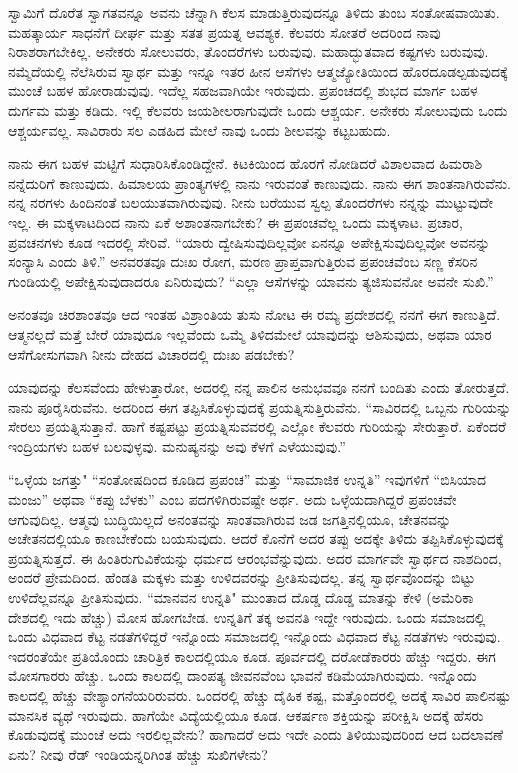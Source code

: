 ಸ್ವಾಮಿಗೆ ದೊರೆತ ಸ್ವಾಗತವನ್ನೂ ಅವನು ಚೆನ್ನಾಗಿ ಕೆಲಸ ಮಾಡುತ್ತಿರುವುದನ್ನೂ ತಿಳಿದು ತುಂಬ ಸಂತೋಷವಾಯಿತು. ಮಹತ್ಕಾರ್ಯ ಸಾಧನೆಗೆ ದೀರ್ಘ ಮತ್ತು ಸತತ ಪ್ರಯತ್ನ ಆವಶ್ಯಕ. ಕೆಲವರು ಸೋತರೆ ಅದರಿಂದ ನಾವು ನಿರಾಶರಾಗಬೇಕಿಲ್ಲ. ಅನೇಕರು ಸೋಲುವರು, ತೊಂದರೆಗಳು ಬರುವುವು. ಮಹಾದ್ಭುತವಾದ ಕಷ್ಟಗಳು ಬರುವುವು. ನಮ್ಮೆದೆಯಲ್ಲಿ ನೆಲೆಸಿರುವ ಸ್ವಾರ್ಥ ಮತ್ತು ಇನ್ನೂ ಇತರ ಹೀನ ಆಸೆಗಳು ಆತ್ಮಜ್ಯೋತಿಯಿಂದ ಹೊರದೂಡಲ್ಪಡುವುದಕ್ಕೆ ಮುಂಚೆ ಬಹಳ ಹೋರಾಡುವುವು. ಇದೆಲ್ಲ ಸಹಜವಾಗಿಯೇ ಇರುವುದು. ಪ್ರಪಂಚದಲ್ಲಿ ಶುಭದ ಮಾರ್ಗ ಬಹಳ ದುರ್ಗಮ ಮತ್ತು ಕಡಿದು. ಇಲ್ಲಿ ಕೆಲವರು ಜಯಶೀಲರಾಗುವುದೇ ಒಂದು ಆಶ್ಚರ್ಯ. ಅನೇಕರು ಸೋಲುವುದು ಒಂದು ಆಶ್ಚರ್ಯವಲ್ಲ. ಸಾವಿರಾರು ಸಲ ಎಡಹಿದ ಮೇಲೆ ನಾವು ಒಂದು ಶೀಲವನ್ನು ಕಟ್ಟಬಹುದು.

ನಾನು ಈಗ ಬಹಳ ಮಟ್ಟಿಗೆ ಸುಧಾರಿಸಿಕೊಂಡಿದ್ದೇನೆ. ಕಿಟಕಿಯಿಂದ ಹೊರಗೆ ನೋಡಿದರೆ ವಿಶಾಲವಾದ ಹಿಮರಾಶಿ ನನ್ನೆದುರಿಗೆ ಕಾಣುವುದು. ಹಿಮಾಲಯ ಪ್ರಾಂತ್ಯಗಳಲ್ಲಿ ನಾನು ಇರುವಂತೆ ಕಾಣುವುದು. ನಾನು ಈಗ ಶಾಂತನಾಗಿರುವೆನು. ನನ್ನ ನರಗಳು ಹಿಂದಿನಂತೆ ಬಲಯುತವಾಗಿರುವುವು. ನೀನು ಬರೆಯುವ ಸ್ವಲ್ಪ ತೊಂದರೆಗಳು ನನ್ನನ್ನು ಮುಟ್ಟುವುದೇ ಇಲ್ಲ. ಈ ಮಕ್ಕಳಾಟದಿಂದ ನಾನು ಏಕೆ ಅಶಾಂತನಾಗಬೇಕು? ಈ ಪ್ರಪಂಚವೆಲ್ಲ ಒಂದು ಮಕ್ಕಳಾಟ. ಪ್ರಚಾರ, ಪ್ರವಚನಗಳು ಕೂಡ ಇದರಲ್ಲಿ ಸೇರಿವೆ. “ಯಾರು ದ್ವೇಷಿಸುವುದಿಲ್ಲವೋ ಏನನ್ನೂ ಅಪೇಕ್ಷಿಸುವುದಿಲ್ಲವೋ ಅವನನ್ನು ಸಂನ್ಯಾಸಿ ಎಂದು ತಿಳಿ.'' ಅನವರತವೂ ದುಃಖ ರೋಗ, ಮರಣ ಪ್ರಾಪ್ತವಾಗುತ್ತಿರುವ ಪ್ರಪಂಚವೆಂಬ ಸಣ್ಣ ಕೆಸರಿನ ಗುಂಡಿಯಲ್ಲಿ ಅಪೇಕ್ಷಿಸುವುದಾದರೂ ಏನಿರುವುದು? “ಎಲ್ಲಾ ಆಸೆಗಳನ್ನು ಯಾವನು ತ್ಯಜಿಸುವನೋ ಅವನೇ ಸುಖಿ.''

ಅನಂತವೂ ಚಿರಶಾಂತವೂ ಆದ ಇಂತಹ ವಿಶ್ರಾಂತಿಯ ತುಸು ನೋಟ ಈ ರಮ್ಯ ಪ್ರದೇಶದಲ್ಲಿ ನನಗೆ ಈಗ ಕಾಣುತ್ತಿದೆ. ಆತ್ಮನಲ್ಲದೆ ಮತ್ತೆ ಬೇರೆ ಯಾವುದೂ ಇಲ್ಲವೆಂದು ಒಮ್ಮೆ ತಿಳಿದಮೇಲೆ ಯಾವುದನ್ನು ಆಶಿಸುವುದು, ಅಥವಾ ಯಾರ ಆಸೆಗೋಸುಗವಾಗಿ ನೀನು ದೇಹದ ವಿಚಾರದಲ್ಲಿ ದುಃಖ ಪಡಬೇಕು?

\vspace{0.1cm}

ಯಾವುದನ್ನು ಕೆಲಸವೆಂದು ಹೇಳುತ್ತಾರೋ, ಅದರಲ್ಲಿ ನನ್ನ ಪಾಲಿನ ಅನುಭವವೂ ನನಗೆ ಬಂದಿತು ಎಂದು ತೋರುತ್ತದೆ. ನಾನು ಪೂರೈಸಿರುವೆನು. ಅದರಿಂದ ಈಗ ತಪ್ಪಿಸಿಕೊಳ್ಳುವುದಕ್ಕೆ ಪ್ರಯತ್ನಿಸುತ್ತಿರುವೆನು. ``ಸಾವಿರದಲ್ಲಿ ಒಬ್ಬನು ಗುರಿಯನ್ನು ಸೇರಲು ಪ್ರಯತ್ನಿ\break ಸುತ್ತಾನೆ. ಹಾಗೆ ಕಷ್ಟಪಟ್ಟು ಪ್ರಯತ್ನಿಸುವವರಲ್ಲಿ ಎಲ್ಲೋ ಕೆಲವರು ಗುರಿಯನ್ನು ಸೇರುತ್ತಾರೆ. ಏಕೆಂದರೆ ಇಂದ್ರಿಯಗಳು ಬಹಳ ಬಲವುಳ್ಳವು. ಮನುಷ್ಯನನ್ನು ಅವು ಕೆಳಗೆ ಎಳೆಯುವುವು.”

\vspace{0.1cm}

``ಒಳ್ಳೆಯ ಜಗತ್ತು" ``ಸಂತೋಷದಿಂದ ಕೂಡಿದ ಪ್ರಪಂಚ'' ಮತ್ತು ``ಸಾಮಾಜಿಕ ಉನ್ನತಿ'' ಇವುಗಳಿಗೆ ``ಬಿಸಿಯಾದ ಮಂಜು'' ಅಥವಾ  ``ಕಪ್ಪು ಬೆಳಕು'' ಎಂಬ ಪದಗಳಿಗಿರುವಷ್ಟೇ ಅರ್ಥ. ಅದು ಒಳ್ಳೆಯದಾಗಿದ್ದರೆ ಪ್ರಪಂಚವೇ ಆಗುವುದಿಲ್ಲ. ಆತ್ಮವು ಬುದ್ಧಿಯಿಲ್ಲದೆ ಅನಂತವನ್ನು ಸಾಂತವಾಗಿರುವ ಜಡ ಜಗತ್ತಿನಲ್ಲಿಯೂ, ಚೇತನವನ್ನು ಅಚೇತನದಲ್ಲಿಯೂ ಕಾಣಬೇಕೆಂದು ಬಯಸುವುದು. ಆದರೆ ಕೊನೆಗೆ ಅದರ ತಪ್ಪು ಅದಕ್ಕೇ ತಿಳಿದು ತಪ್ಪಿಸಿಕೊಳ್ಳುವುದಕ್ಕೆ ಪ್ರಯತ್ನಿಸುತ್ತದೆ. ಈ ಹಿಂತಿರುಗುವಿಕೆಯನ್ನು ಧರ್ಮದ ಆರಂಭವೆನ್ನುವುದು. ಅದರ ಮಾರ್ಗವೇ ಸ್ವಾರ್ಥದ ನಾಶದಿಂದ, ಅಂದರೆ ಪ್ರೇಮದಿಂದ. ಹೆಂಡತಿ ಮಕ್ಕಳು ಮತ್ತು ಉಳಿದವರನ್ನು ಪ್ರೀತಿಸುವುದಲ್ಲ. ತನ್ನ ಸ್ವಾರ್ಥವೊಂದನ್ನು ಬಿಟ್ಟು ಉಳಿದೆಲ್ಲವನ್ನೂ ಪ್ರೀತಿಸುವುದು. ``ಮಾನವನ ಉನ್ನತಿ" ಮುಂತಾದ ದೊಡ್ಡ ದೊಡ್ಡ ಮಾತನ್ನು ಕೇಳಿ (ಅಮೆರಿಕಾ ದೇಶದಲ್ಲಿ ಇದು ಹೆಚ್ಚು) ಮೋಸ ಹೋಗಬೇಡ. ಉನ್ನತಿಗೆ ತಕ್ಕ ಅವನತಿ ಇದ್ದೇ ಇರುವುದು. ಒಂದು ಸಮಾಜದಲ್ಲಿ ಒಂದು ವಿಧವಾದ ಕೆಟ್ಟ ನಡತೆಗಳಿದ್ದರೆ ಇನ್ನೊಂದು ಸಮಾಜದಲ್ಲಿ ಇನ್ನೊಂದು ವಿಧವಾದ ಕೆಟ್ಟ ನಡತೆಗಳು ಇರುವುವು. ಇದರಂತೆಯೇ ಪ್ರತಿಯೊಂದು ಚಾರಿತ್ರಿಕ ಕಾಲದಲ್ಲಿಯೂ ಕೂಡ. ಪೂರ್ವದಲ್ಲಿ ದರೋಡೆಕಾರರು ಹೆಚ್ಚು ಇದ್ದರು. ಈಗ ಮೋಸಗಾರರು ಹೆಚ್ಚು. ಒಂದು ಕಾಲದಲ್ಲಿ ದಾಂಪತ್ಯ ಜೀವನವೆಂಬ ಭಾವನೆ ಕಡಿಮೆಯಾಗಿರುವುದು. ಇನ್ನೊಂದು ಕಾಲದಲ್ಲಿ ಹೆಚ್ಚು ವೇಶ್ಯಾಂಗನೆಯರಿರುವರು. ಒಂದರಲ್ಲಿ ಹೆಚ್ಚು ದೈಹಿಕ ಕಷ್ಟ, ಮತ್ತೊಂದರಲ್ಲಿ ಅದಕ್ಕೆ ಸಾವಿರ ಪಾಲಿನಷ್ಟು ಮಾನಸಿಕ ವ್ಯಥೆ ಇರುವುದು. ಹಾಗೆಯೇ ವಿದ್ಯೆಯಲ್ಲಿಯೂ ಕೂಡ. ಆಕರ್ಷಣ ಶಕ್ತಿಯನ್ನು ಪರೀಕ್ಷಿಸಿ ಅದಕ್ಕೆ ಹೆಸರು ಕೊಡುವುದಕ್ಕೆ ಮುಂಚೆ ಅದು ಇರಲಿಲ್ಲವೇನು? ಹಾಗಾದರೆ ಅದು ಇದೇ ಎಂದು ತಿಳಿಯುವುದರಿಂದ ಆದ ಬದಲಾವಣೆ ಏನು? ನೀವು ರೆಡ್ ಇಂಡಿಯನ್ನರಿಗಿಂತ ಹೆಚ್ಚು ಸುಖಿಗಳೇನು?

